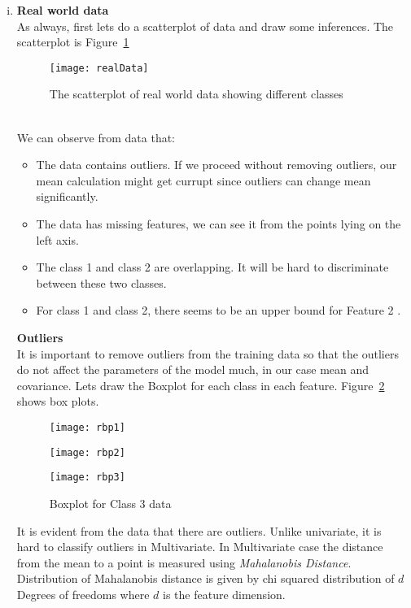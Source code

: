 \documentclass[11pt,paper=a4,answers]{exam}
\begin{document}
\begin{questions}
\begin{enumerate}[i.]
    \item \label{Real world data} \textbf{Real world data}\\
        As always, first lets do a scatterplot of data and draw some inferences. The scatterplot is Figure~\ref{fig:Rdata}
        \begin{figure}[ht]
            \centering
            \texttt{[image: realData]}
            \caption{The scatterplot of real world data showing different classes}
            \label{fig:Rdata}        
        \end{figure}\\
        \FloatBarrier
        We can observe from data that:
        \begin{itemize}
            \item The data contains outliers. If we proceed without removing outliers, our mean calculation might get currupt since outliers can change mean significantly.
            \item The data has missing features, we can see it from the points lying on the left axis.
            \item The class 1 and class 2 are overlapping. It will be hard to discriminate between these two classes.
            \item For class 1 and class 2, there seems to be an upper bound for Feature 2 .
        \end{itemize}
        \textbf{Outliers}\\
        It is important to remove outliers from the training data so that the outliers do not affect the parameters of the model much, in our case mean and covariance. 
        Lets draw the Boxplot for each class in each feature. Figure~\ref{rdatabp} shows box plots.\\
        \begin{figure}[htb]
              \texttt{[image: rbp1]}
              \caption{Boxplot for Class 1 data}\label{rdatabp}
            \endminipage\hfill
              \texttt{[image: rbp2]}
              \caption{Boxplot for Class 2 data}
            \endminipage\hfill
              \texttt{[image: rbp3]}
              \caption{Boxplot for Class 3 data}
            \endminipage
        \end{figure}
        It is evident from the data that there are outliers.
        Unlike univariate, it is hard to classify outliers in Multivariate. In Multivariate case the distance from the mean to a point is measured using \textit{Mahalanobis Distance}. Distribution of Mahalanobis distance is given by chi squared distribution of $d$ Degrees of freedoms where $d$ is the feature dimension.\\

\end{enumerate}
\end{questions}
\end{document}
